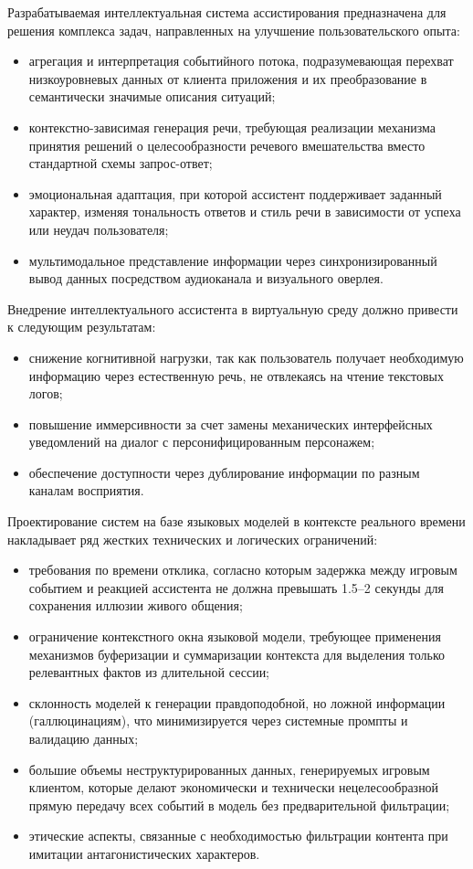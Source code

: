 Разрабатываемая интеллектуальная система ассистирования предназначена для решения комплекса задач, направленных на улучшение пользовательского опыта\cite{Wang2023}:
\begin{itemize}
    \item агрегация и интерпретация событийного потока, подразумевающая перехват низкоуровневых данных от клиента приложения и их преобразование в семантически значимые описания ситуаций;
    \item контекстно-зависимая генерация речи, требующая реализации механизма принятия решений о целесообразности речевого вмешательства вместо стандартной схемы запрос-ответ;
    \item эмоциональная адаптация, при которой ассистент поддерживает заданный характер, изменяя тональность ответов и стиль речи в зависимости от успеха или неудач пользователя;
    \item мультимодальное представление информации через синхронизированный вывод данных посредством аудиоканала и визуального оверлея.
\end{itemize}

Внедрение интеллектуального ассистента в виртуальную среду должно привести к следующим результатам:
\begin{itemize}
    \item снижение когнитивной нагрузки, так как пользователь получает необходимую информацию через естественную речь, не отвлекаясь на чтение текстовых логов;
    \item повышение иммерсивности за счет замены механических интерфейсных уведомлений на диалог с персонифицированным персонажем;
    \item обеспечение доступности через дублирование информации по разным каналам восприятия.
\end{itemize}

Проектирование систем на базе языковых моделей в контексте реального времени накладывает ряд жестких технических и логических ограничений\cite{Xi2023}:
\begin{itemize}
    \item требования по времени отклика, согласно которым задержка между игровым событием и реакцией ассистента не должна превышать 1.5–2 секунды для сохранения иллюзии живого общения;
    \item ограничение контекстного окна языковой модели, требующее применения механизмов буферизации и суммаризации контекста для выделения только релевантных фактов из длительной сессии;
    \item склонность моделей к генерации правдоподобной, но ложной информации (галлюцинациям), что минимизируется через системные промпты и валидацию данных;
    \item большие объемы неструктурированных данных, генерируемых игровым клиентом, которые делают экономически и технически нецелесообразной прямую передачу всех событий в модель без предварительной фильтрации;
    \item этические аспекты, связанные с необходимостью фильтрации контента при имитации антагонистических характеров.
\end{itemize}



